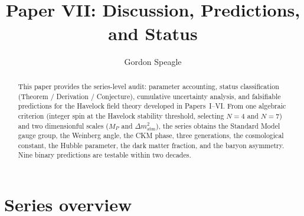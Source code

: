 








\title{\seriestitle\\[6pt]\large Paper VII: Discussion, Predictions, and Status}
\author{Gordon Speagle}
\date{}


\maketitle

\begin{abstract}
This paper provides the series-level audit: parameter accounting,
status classification (Theorem / Derivation / Conjecture),
cumulative uncertainty analysis, and falsifiable predictions
for the Havelock field theory developed in Papers~I--VI.
From one algebraic criterion (integer spin at the
Havelock stability threshold, selecting $N = 4$ and $N = 7$)
and two dimensionful scales ($M_P$ and
$\Delta m^2_{\mathrm{atm}}$),
the series obtains the Standard Model gauge group, the Weinberg
angle, the CKM phase, three generations, the cosmological
constant, the Hubble parameter, the dark matter fraction,
and the baryon asymmetry.
Nine binary predictions are testable within two decades.
\end{abstract}

\section{Series overview}
\label{sec:overview}

